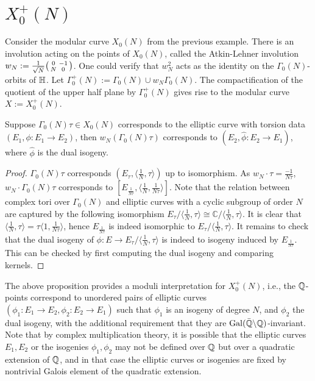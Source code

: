 \section{$X_0^+(N)$}

Consider the modular curve $X_0(N)$ from the previous example. There is an involution acting on the points of $X_0(N)$, called the Atkin-Lehner involution $w_N := \frac{1}{\sqrt{N}} \begin{psmallmatrix} 0 & -1 \\ N & 0 \end{psmallmatrix}$. One could verify that $w_N^2$ acts as the identity on the $\Gamma_0(N)$-orbits of $\mathbb{H}$. Let $\Gamma_0^+(N) := \Gamma_0(N) \cup w_N \Gamma_0(N)$. The compactification of the quotient of the upper half plane by $\Gamma_0^+(N)$ gives rise to the modular curve $X:=X_0^+(N)$.

\begin{proposition}\label{moduli_Nplus}
Suppose $\Gamma_0(N) \tau \in X_0(N)$ corresponds to the elliptic curve with torsion data $(E_1, \phi:E_1\rightarrow E_2)$, then $w_N(\Gamma_0(N) \tau )$  corresponds to $(E_2,\hat{\phi}:E_2\rightarrow E_1)$, where $\hat{\phi}$ is the dual isogeny.
\end{proposition}

\begin{proof}
$\Gamma_0(N)\tau$ corresponds $(E_\tau,\langle\frac{1}{N},\tau \rangle)$ up to isomorphism. As $w_N \cdot \tau = \frac{-1}{N\tau}$, $w_N\cdot \Gamma_0(N)\tau$ corresponds to $[E_{\frac{1}{N\tau}}, \langle\frac{1}{N}, \frac{1}{N\tau} \rangle]$. Note that the relation between complex tori over $\Gamma_0(N)$ and elliptic curves with a cyclic subgroup of order $N$ are captured by the following isomorphism $E_\tau/\langle\frac{1}{N},\tau\rangle \cong \mathbb{C}/\langle\frac{1}{N},\tau\rangle$. It is clear that  $\langle\frac{1}{N},\tau\rangle = \tau \langle 1,\frac{1}{N\tau}\rangle$, hence $E_{\frac{1}{N\tau}}$ is indeed isomorphic to $E_\tau/\langle\frac{1}{N},\tau\rangle$. It remains to check that the dual isogeny of $\phi:E \rightarrow E_\tau/\langle\frac{1}{N},\tau\rangle$ is indeed to isogeny induced by $E_{\frac{1}{N\tau}}$. This can be checked by first computing the dual isogeny and comparing kernels.
\end{proof}

The above proposition provides a moduli interpretation for $X_0^+(N)$, i.e., the $\mathbb{Q}$-points correspond to unordered pairs of elliptic curves $(\phi_1: E_1 \rightarrow E_2, \phi_2: E_2 \rightarrow E_1)$ such that $\phi_1$ is an isogeny of degree $N$, and $\phi_2$ the dual isogeny, with the additional requirement that they are $\operatorname{Gal}(\bar{\mathbb{Q}}\backslash \mathbb{Q})$-invariant. Note that by complex multiplication theory, it is possible that the elliptic curves $E_1,E_2$ or the isogenies $\phi_1,\phi_2$ may not be defined over $\mathbb{Q}$ but over a quadratic extension of $\mathbb{Q}$, and in that case the elliptic curves or isogenies are fixed by nontrivial Galois element of the quadratic extension.

